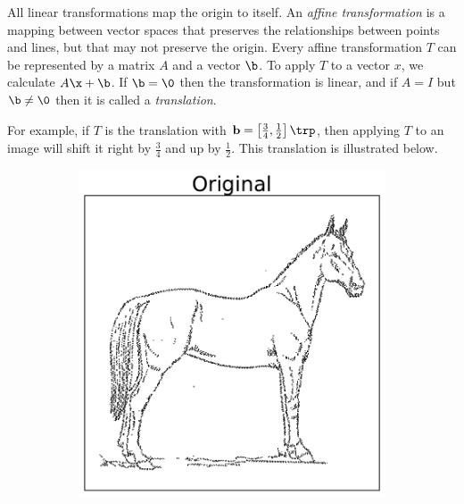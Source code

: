 All linear transformations map the origin to itself.
An \emph{affine transformation} is a mapping between vector spaces that preserves the relationships between points and lines, but that may not preserve the origin.
Every affine transformation $T$ can be represented by a matrix $A$ and a vector $\b$.
To apply $T$ to a vector $x$, we calculate $A\x + \b$.
If $\b = \0$ then the transformation is linear, and if $A = I$ but $\b\neq\0$ then it is called a \emph{translation}.

For example, if $T$ is the translation with $\mathbf{b} = \left[\frac{3}{4}, \frac{1}{2}\right]\trp$, then applying $T$ to an image will shift it right by $\frac{3}{4}$ and up by $\frac{1}{2}$.
This translation is illustrated below.

\begin{figure}[H] %
\captionsetup[subfigure]{justification=centering}
\centering
\begin{subfigure}{.32\textwidth}
    \centering
    \includegraphics[width=\linewidth]{figures/OriginalHorse.pdf}
\end{subfigure}%
\begin{subfigure}{.32\textwidth}
    \centering

\end{subfigure}
\end{figure}
